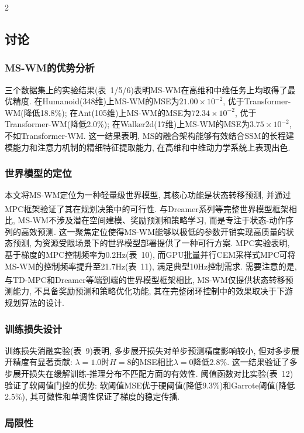 \begin{multicols}{2}
\subsection{讨论}

\subsubsection{MS-WM的优势分析}

三个数据集上的实验结果(表~1/5/6)表明MS-WM在高维和中维任务上均取得了最优精度.
在Humanoid(348维)上MS-WM的MSE为$21.00{\times}10^{-2}$, 优于Transformer-WM(降低18.8\%);
在Ant(105维)上MS-WM的MSE为$72.34{\times}10^{-2}$, 优于Transformer-WM(降低2.0\%);
在Walker2d(17维)上MS-WM的MSE为$3.75{\times}10^{-2}$, 不如Transformer-WM.
这一结果表明, MS的融合架构能够有效结合SSM的长程建模能力和注意力机制的精细特征提取能力, 在高维和中维动力学系统上表现出色.

\subsubsection{世界模型的定位}

本文将MS-WM定位为一种轻量级世界模型, 其核心功能是状态转移预测, 并通过MPC框架验证了其在规划决策中的可行性.
与Dreamer系列\textsuperscript{\cite{10,11}}等完整世界模型框架相比, MS-WM不涉及潜在空间建模、奖励预测和策略学习, 而是专注于状态-动作序列的高效预测.
这一聚焦定位使得MS-WM能够以极低的参数开销实现高质量的状态预测, 为资源受限场景下的世界模型部署提供了一种可行方案.
MPC实验表明, 基于梯度的MPC控制频率为0.2Hz(表~10), 而GPU批量并行CEM采样式MPC可将MS-WM的控制频率提升至21.7Hz(表~11), 满足典型10Hz控制需求.
需要注意的是, 与TD-MPC\textsuperscript{\cite{1}}和Dreamer\textsuperscript{\cite{10}}等端到端的世界模型框架相比, MS-WM仅提供状态转移预测能力, 不具备奖励预测和策略优化功能, 其在完整闭环控制中的效果取决于下游规划算法的设计.

\subsubsection{训练损失设计}

训练损失消融实验(表~9)表明, 多步展开损失对单步预测精度影响较小, 但对多步展开精度有显著贡献: $\lambda{=}1.0$时$H{=}8$的MSE相比$\lambda{=}0$降低2.8\%.
这一结果验证了多步展开损失在缓解训练-推理分布不匹配方面的有效性.
阈值函数对比实验(表~12)验证了软阈值门控的优势: 软阈值MSE优于硬阈值(降低9.3\%)和Garrote阈值(降低2.5\%), 其可微性和单调性保证了梯度的稳定传播.

\subsubsection{局限性}


\end{multicols}
